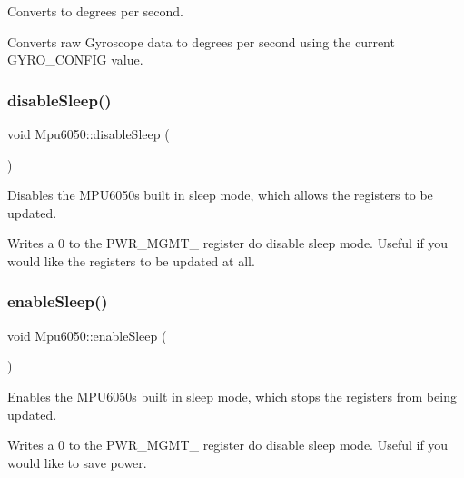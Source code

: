 Converts to degrees per second. 

Converts raw Gyroscope data to degrees per second using the current G\+Y\+R\+O\+\_\+\+C\+O\+N\+F\+IG value. \mbox{\label{classMpu6050_a34c0508df81ca0f2dbcf9b6fba21148e}} 
\subsubsection{\texorpdfstring{disable\+Sleep()}{disableSleep()}}
{\footnotesize\ttfamily void Mpu6050\+::disable\+Sleep (\begin{DoxyParamCaption}{ }\end{DoxyParamCaption})\hspace{0.3cm}{\ttfamily [virtual]}}



Disables the M\+P\+U6050\textquotesingle{}s built in sleep mode, which allows the registers to be updated. 

Writes a 0 to the P\+W\+R\+\_\+\+M\+G\+M\+T\+\_ register do disable sleep mode. Useful if you would like the registers to be updated at all. \mbox{\label{classMpu6050_a495edda1413fbc77ef66831a6f6da729}} 
\subsubsection{\texorpdfstring{enable\+Sleep()}{enableSleep()}}
{\footnotesize\ttfamily void Mpu6050\+::enable\+Sleep (\begin{DoxyParamCaption}{ }\end{DoxyParamCaption})\hspace{0.3cm}{\ttfamily [virtual]}}



Enables the M\+P\+U6050\textquotesingle{}s built in sleep mode, which stops the registers from being updated. 

Writes a 0 to the P\+W\+R\+\_\+\+M\+G\+M\+T\+\_ register do disable sleep mode. Useful if you would like to save power. \mbox{\label{classMpu6050_a2f4ca51ed27c06d62b8060841c62ec4b}} 

